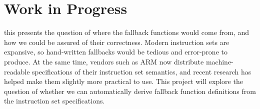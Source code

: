 \section{Work in Progress}
\label{sec:wip}


this presents the question of where the fallback functions would come from, and
how we could be assured of their correctness. Modern instruction sets are
expansive, so hand-written fallbacks would be tedious and error-prone to
produce. At the same time, vendors such as ARM now distribute machine-readable
specifications of their instruction set semantics, and recent research has
helped make them slightly more practical to use. This project will explore the
question of whether we can automatically derive fallback function definitions
from the instruction set specifications.
